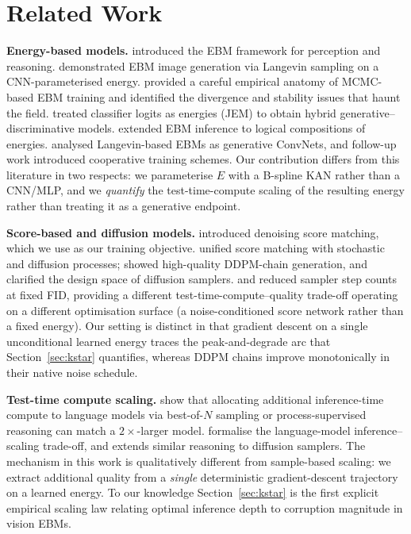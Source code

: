 \documentclass{article}
\begin{document}

\section{Related Work}
\label{app:related}
\label{sec:related}

\textbf{Energy-based models.} \citet{lecun2006ebm} introduced the EBM framework
for perception and reasoning. \citet{du2019implicit} demonstrated EBM image
generation via Langevin sampling on a CNN-parameterised energy.
\citet{nijkamp2019anatomy} provided a careful empirical anatomy of MCMC-based
EBM training and identified the divergence and stability issues that haunt the
field. \citet{grathwohl2019jempp} treated classifier logits as energies (JEM)
to obtain hybrid generative--discriminative models. \citet{du2021conjunction}
extended EBM inference to logical compositions of energies.
\citet{xie2016theory} analysed Langevin-based EBMs as generative ConvNets, and
follow-up work \citep{gao2020learning} introduced cooperative training schemes.
Our contribution differs from this literature in two respects: we
parameterise $E$ with a B-spline KAN rather than a CNN/MLP, and we
\emph{quantify} the test-time-compute scaling of the resulting energy rather
than treating it as a generative endpoint.

\textbf{Score-based and diffusion models.} \citet{vincent2011dsm} introduced
denoising score matching, which we use as our training objective.
\citet{song2019generative,song2020improved,song2021score} unified score
matching with stochastic and diffusion processes; \citet{ho2020ddpm} showed
high-quality DDPM-chain generation, and \citet{karras2022elucidating}
clarified the design space of diffusion samplers. \citet{kim2022softtruncation}
and \citet{lu2022dpmsolver} reduced sampler step counts at fixed FID, providing
a different test-time-compute--quality trade-off operating on a different
optimisation surface (a noise-conditioned score network rather than a fixed
energy). Our setting is distinct in that gradient descent on a single
unconditional learned energy traces the peak-and-degrade arc that
Section~\ref{sec:kstar} quantifies, whereas DDPM chains improve monotonically
in their native noise schedule.

\textbf{Test-time compute scaling.} \citet{snell2024llm} show that allocating
additional inference-time compute to language models via best-of-$N$ sampling
or process-supervised reasoning can match a $2{\times}$-larger model.
\citet{brown2024llm_scaling} formalise the language-model inference--scaling
trade-off, and \citet{wu2024inference} extends similar reasoning to diffusion
samplers. The mechanism in this work is qualitatively different from
sample-based scaling: we extract additional quality from a \emph{single}
deterministic gradient-descent trajectory on a learned energy. To our
knowledge Section~\ref{sec:kstar} is the first explicit empirical scaling law
relating optimal inference depth to corruption magnitude in vision EBMs.
\end{document}
